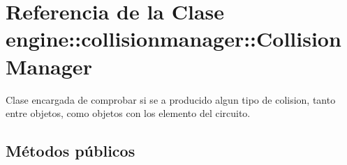 \hypertarget{classengine_1_1collisionmanager_1_1CollisionManager}{
\section{\-Referencia de la \-Clase engine\-:\-:collisionmanager\-:\-:\-Collision\-Manager}
\label{classengine_1_1collisionmanager_1_1CollisionManager}
}


\-Clase encargada de comprobar si se a producido algun tipo de colision, tanto entre objetos, como objetos con los elemento del circuito.  


\subsection*{\-Métodos públicos}
